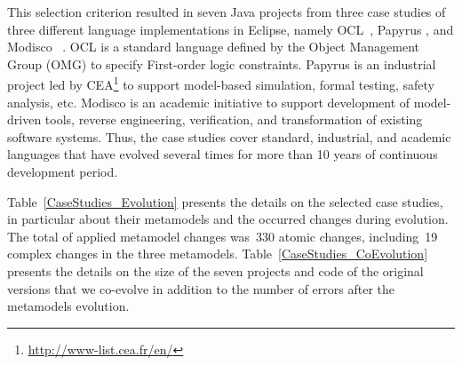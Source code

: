 
This selection criterion resulted in seven Java projects from three case studies of three different language implementations in Eclipse, namely OCL~\cite{MDTOCL}, Papyrus \cite{MDTPapyrus}, and Modisco~\cite{MDTModisco} .
%
OCL is a standard language defined by the Object Management Group (OMG) to specify First-order logic constraints. Papyrus is an industrial project led by CEA\footnote{\url{http://www-list.cea.fr/en/}} to support model-based simulation, formal testing, safety analysis, etc. Modisco is an academic initiative to support development of model-driven tools, reverse engineering, verification, and transformation of existing software systems. 
Thus, the case studies cover standard, industrial, and academic languages that have evolved several times for more than 10 years of continuous development period.

Table~\ref{CaseStudies_Evolution} presents the details on the selected case studies, in particular about their metamodels and the occurred changes during evolution. The total of applied metamodel changes was~330 atomic changes, including~19 complex changes in the three metamodels. 
%
Table~\ref{CaseStudies_CoEvolution} presents the details on the size of the seven projects and code of the original versions that we co-evolve in addition to the number of errors after the metamodels evolution. 

